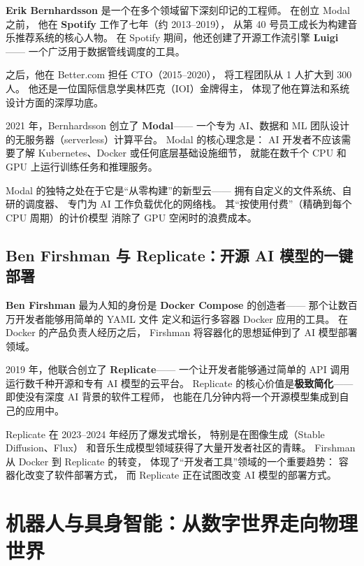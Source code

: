 \textbf{Erik Bernhardsson} 是一个在多个领域留下深刻印记的工程师。
在创立 Modal 之前，
他在 \textbf{Spotify} 工作了七年（约 2013--2019），
从第 40 号员工成长为构建音乐推荐系统的核心人物。
在 Spotify 期间，他还创建了开源工作流引擎 \textbf{Luigi}——
一个广泛用于数据管线调度的工具。

之后，他在 Better.com 担任 CTO（2015--2020），
将工程团队从 1 人扩大到 300 人。
他还是一位国际信息学奥林匹克（IOI）金牌得主，
体现了他在算法和系统设计方面的深厚功底。

2021 年，Bernhardsson 创立了 \textbf{Modal}——
一个专为 AI、数据和 ML 团队设计的无服务器（serverless）计算平台。
Modal 的核心理念是：
AI 开发者不应该需要了解 Kubernetes、Docker
或任何底层基础设施细节，
就能在数千个 CPU 和 GPU 上运行训练任务和推理服务。

Modal 的独特之处在于它是``从零构建''的新型云——
拥有自定义的文件系统、自研的调度器、
专门为 AI 工作负载优化的网络栈。
其``按使用付费''（精确到每个 CPU 周期）的计价模型
消除了 GPU 空闲时的浪费成本。


\subsection{Ben Firshman 与 Replicate：开源 AI 模型的一键部署}
\label{subsec:ben-firshman}

\textbf{Ben Firshman} 最为人知的身份是 \textbf{Docker Compose} 的创造者——
那个让数百万开发者能够用简单的 YAML 文件
定义和运行多容器 Docker 应用的工具。
在 Docker 的产品负责人经历之后，
Firshman 将容器化的思想延伸到了 AI 模型部署领域。

2019 年，他联合创立了 \textbf{Replicate}——
一个让开发者能够通过简单的 API 调用
运行数千种开源和专有 AI 模型的云平台。
Replicate 的核心价值是\textbf{极致简化}——
即使没有深度 AI 背景的软件工程师，
也能在几分钟内将一个开源模型集成到自己的应用中。

Replicate 在 2023--2024 年经历了爆发式增长，
特别是在图像生成（Stable Diffusion、Flux）
和音乐生成模型领域获得了大量开发者社区的青睐。
Firshman 从 Docker 到 Replicate 的转变，
体现了``开发者工具''领域的一个重要趋势：
容器化改变了软件部署方式，
而 Replicate 正在试图改变 AI 模型的部署方式。


\section{机器人与具身智能：从数字世界走向物理世界}
\label{sec:robotics}


